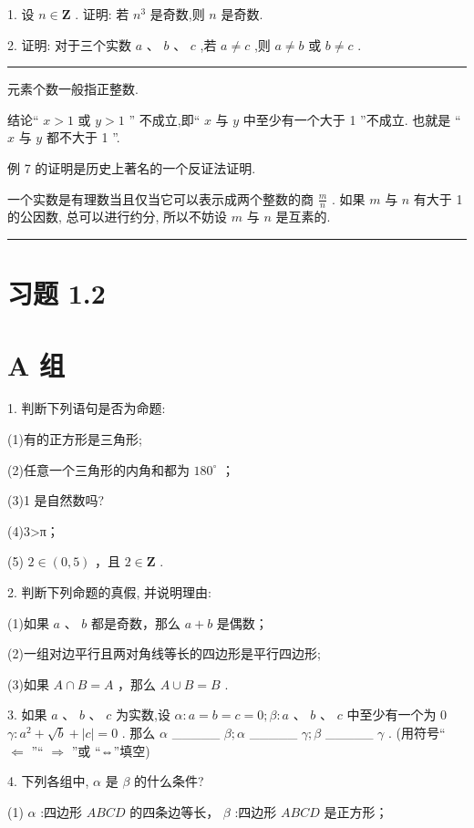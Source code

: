 \documentclass[10pt]{article}
\newcommand{\HRule}{\begin{center}\rule{0.9\linewidth}{0.2mm}\end{center}}
\begin{document}
1. 设 \(n \in  \mathbf{Z}\) . 证明: 若 \({n}^{3}\) 是奇数,则 \(n\) 是奇数.

2. 证明: 对于三个实数 \(a\text{ 、 }b\text{ 、 }c\) ,若 \(a \neq  c\) ,则 \(a \neq  b\) 或 \(b \neq  c\) .

\HRule

元素个数一般指正整数.

结论“ \(x > 1\) 或 \(y > 1\) ” 不成立,即“ \(x\) 与 \(y\) 中至少有一个大于 1 ”不成立. 也就是 “ \(x\) 与 \(y\) 都不大于 1 ”.

例 7 的证明是历史上著名的一个反证法证明.

一个实数是有理数当且仅当它可以表示成两个整数的商 \(\frac{m}{n}\) . 如果 \(m\) 与 \(n\) 有大于 1 的公因数, 总可以进行约分, 所以不妨设 \(m\) 与 \(n\) 是互素的.

\HRule

\section*{习题 1.2}

\section*{A 组}

1. 判断下列语句是否为命题:

(1)有的正方形是三角形;

(2)任意一个三角形的内角和都为 \({180}^{ \circ  }\) ；

(3)1 是自然数吗?

(4)3>π；

(5) \(2 \in  \left( {0,5}\right)\) ，且 \(2 \in  \mathbf{Z}\) .

2. 判断下列命题的真假, 并说明理由:

(1)如果 \(a\text{ 、 }b\) 都是奇数，那么 \(a + b\) 是偶数；

(2)一组对边平行且两对角线等长的四边形是平行四边形;

(3)如果 \(A \cap  B = A\) ，那么 \(A \cup  B = B\) .

3. 如果 \(a\text{ 、 }b\text{ 、 }c\) 为实数,设 \(\alpha  : a = b = c = 0;\beta  : a\text{ 、 }b\text{ 、 }c\) 中至少有一个为 0 \(\gamma  : {a}^{2} + \sqrt{b} + \left| c\right|  = 0\) . 那么 \(\alpha\) \_\_\_\_\_ \(\beta ;\alpha\) \_\_\_\_\_ \(\gamma ;\beta\) \_\_\_\_\_ \(\gamma\) . (用符号“ \(\Leftarrow\) ”“ \(\Rightarrow\) ”或 “⇔”填空)

4. 下列各组中, \(\alpha\) 是 \(\beta\) 的什么条件?

(1) \(\alpha\) :四边形 \({ABCD}\) 的四条边等长， \(\beta\) :四边形 \({ABCD}\) 是正方形；
\end{document}
